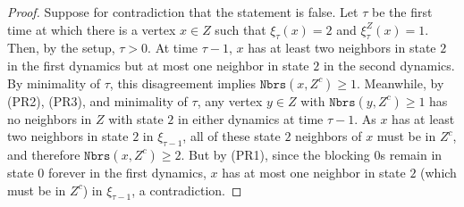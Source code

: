 \documentclass{article}
\numberwithin{equation}{section}
\begin{document}
\begin{proof}


Suppose for contradiction that the statement is false.
Let $\tau$ be the first time at which there is a vertex $x \in Z$ such that $\xi_\tau(x) = 2$ and $\xi_\tau^Z(x) = 1$.
Then, by the setup, $\tau > 0$.
At time $\tau - 1$, $x$ has at least two neighbors in state $2$ in the first dynamics but at most one neighbor in state $2$ in the second dynamics. 
By minimality of $\tau$, this disagreement implies $\texttt{Nbrs}(x, Z^c) \geq 1$.
Meanwhile, by (PR2), (PR3), and minimality of $\tau$, any vertex $y \in Z$ with $\texttt{Nbrs}(y, Z^c) \geq 1$ has no neighbors in $Z$ with state $2$ in either dynamics at time $\tau - 1$.
As $x$ has at least two neighbors in state $2$ in $\xi_{\tau - 1}$, all of these state $2$ neighbors of $x$ must be in $Z^c$, and therefore $\texttt{Nbrs}(x, Z^c) \geq 2$.
But by (PR1), since the blocking $0$s remain in state $0$ forever in the first dynamics, $x$ has at most one neighbor in state $2$ (which must be in $Z^c$) in $\xi_{\tau - 1}$, a contradiction.
\end{proof}
\end{document}
